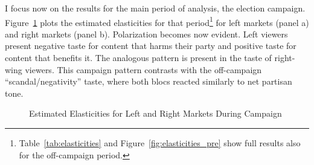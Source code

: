 \documentclass[12pt]{article}
\begin{document}
	 I focus now on the results for the main period of analysis, the election campaign. Figure~\ref{fig:elasticities_campaign} plots the estimated elasticities for that period\footnote{Table~\ref{tab:elasticities} and 	 Figure~\ref{fig:elasticities_pre} show full results also for the off-campaign period. } for left markets (panel a) and right markets (panel b).	Polarization becomes now evident. Left viewers present negative taste for content that harms their party and positive taste for content that benefits it. The analogous pattern is present in the taste of right-wing viewers. This campaign pattern contrasts with the off-campaign “scandal/negativity” taste, where both blocs reacted similarly to net partisan tone.
	 
	 
	 
	 \begin{figure}[!htbp]
	 	\centering
	 	\caption{Estimated Elasticities for Left and Right Markets During Campaign}
	 	\label{fig:elasticities_campaign}
	 	\vspace{0.5em} %
	 	

\end{figure}
\end{document}
